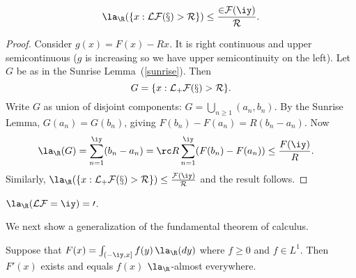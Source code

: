 \begin{lem}\label{hlineq}
\[
\la_{\R}(\{x:\cal LF(x)>R\})\le \frac{2F(\iy)}{R}.
\]
\end{lem}
\begin{proof}
Consider $g(x)=F(x)-Rx$. It is right continuous and upper semicontinuous ($g$ is increasing so we have upper semicontinuity on the left). Let $G$ be as in the Sunrise Lemma~(\ref{sunrise}). Then
\[
G=\{x:\cal L_+F(x)>R\}.
\]
Write $G$ as union of disjoint components: $G=\bigcup_{n\ge 1}(a_n,b_n)$. By the Sunrise Lemma, $G(a_n)=G(b_n)$, giving $F(b_n)-F(a_n)=R(b_n-a_n)$. Now
\begin{align*}
\la_{\R}(G)&=\sum_{n=1}^{\iy} (b_n-a_n)=\rc R\sum_{n=1}^{\iy} (F(b_n)-F(a_n))\le \frac{F(\iy)}{R}.
\end{align*}
Similarly, $\la_{\R}(\{x:\cal L_+F(x)>R\})\le \frac{F(\iy)}{R}$ and the result follows. 
\end{proof}
\begin{cor}\label{larlf}
$\la_{\R}(\cal L F=\iy)=0$.
\end{cor}
We next show a generalization of the fundamental theorem of calculus.
\begin{thm}\label{ftoc2}
Suppose that $F(x)=\int_{(-\iy,x]} f(y)\,\la_{\R}(dy)$ where $f\ge 0$ and $f\in L^1$. Then $F'(x)$ exists and equals $f(x)$ $\la_{\R}$-almost everywhere. 
\end{thm}
